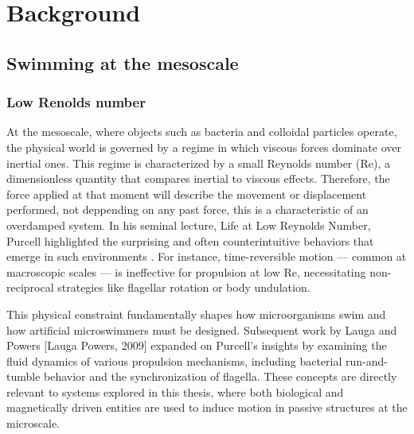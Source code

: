 



\part{Background}
\label{part:background}

\chapter{Swimming at the mesoscale}
\label{ch:swimming at the mesoscale}


\section{Low Renolds number}

At the mesoscale, where objects such as bacteria and colloidal particles operate, the physical world is governed by a regime in which viscous forces dominate over inertial ones. This regime is characterized by a small Reynolds number (Re), a dimensionless quantity that compares inertial to viscous effects. Therefore, the force applied at that moment will describe the movement or displacement performed, not deppending on any past force, this is a characteristic of an overdamped system. In his seminal lecture, Life at Low Reynolds Number, Purcell highlighted the surprising and often counterintuitive behaviors that emerge in such environments \cite{purcell2014life}. For instance, time-reversible motion — common at macroscopic scales — is ineffective for propulsion at low Re, necessitating non-reciprocal strategies like flagellar rotation or body undulation. 

This physical constraint fundamentally shapes how microorganisms swim and how artificial microswimmers must be designed. Subsequent work by Lauga and Powers [Lauga Powers, 2009] expanded on Purcell's insights by examining the fluid dynamics of various propulsion mechanisms, including bacterial run-and-tumble behavior and the synchronization of flagella. These concepts are directly relevant to systems explored in this thesis, where both biological and magnetically driven entities are used to induce motion in passive structures at the microscale.



\newpage
